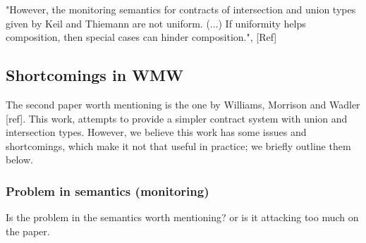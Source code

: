 "However, the monitoring semantics for contracts of intersection and union types given by Keil
and Thiemann are not uniform. (...) If uniformity helps composition, then
special cases can hinder composition.", [Ref]

\subsection{Shortcomings in WMW}

The second paper worth mentioning is the one by Williams, Morrison and Wadler [ref].
This work, attempts to provide a simpler contract system with
union and intersection types.
However, we believe this work has some issues and shortcomings, which make it
not that useful in practice; we briefly outline them below.



\subsubsection*{Problem in semantics (monitoring)}
Is the problem in the semantics worth mentioning? or is it attacking
too much on the paper.
